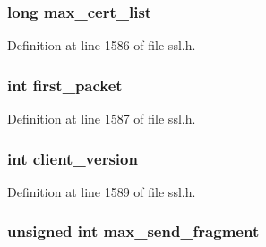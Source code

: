 \subsubsection[{\texorpdfstring{max\+\_\+cert\+\_\+list}{max_cert_list}}]{\setlength{\rightskip}{0pt plus 5cm}long max\+\_\+cert\+\_\+list}\hypertarget{structssl__st_aff3458de3fb94545236802c4042dc051}{}\label{structssl__st_aff3458de3fb94545236802c4042dc051}


Definition at line 1586 of file ssl.\+h.

\subsubsection[{\texorpdfstring{first\+\_\+packet}{first_packet}}]{\setlength{\rightskip}{0pt plus 5cm}int first\+\_\+packet}\hypertarget{structssl__st_ad32fcbc2b36297743a11face122ec053}{}\label{structssl__st_ad32fcbc2b36297743a11face122ec053}


Definition at line 1587 of file ssl.\+h.

\subsubsection[{\texorpdfstring{client\+\_\+version}{client_version}}]{\setlength{\rightskip}{0pt plus 5cm}int client\+\_\+version}\hypertarget{structssl__st_addfcf5d7fdf014c692daa76a5b816c37}{}\label{structssl__st_addfcf5d7fdf014c692daa76a5b816c37}


Definition at line 1589 of file ssl.\+h.

\subsubsection[{\texorpdfstring{max\+\_\+send\+\_\+fragment}{max_send_fragment}}]{\setlength{\rightskip}{0pt plus 5cm}unsigned int max\+\_\+send\+\_\+fragment}\hypertarget{structssl__st_a15c488cf6f57671d97ad93153fdc5965}{}\label{structssl__st_a15c488cf6f57671d97ad93153fdc5965}


